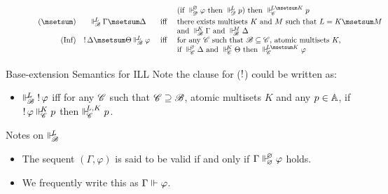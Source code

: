 \documentclass{beamer}
\begin{document}
\begin{frame}
\begin{minipage}{0.47\textwidth}
\begin{figure}[t]
\[\begin{array}{r@{\qquad}l@{\quad}c@{\quad}l}
					& & & (\text{if } \suppM{\baseD}{\emptymultiset}\varphi \text{ then } \suppM{\baseD}{L}p) \text{ then } \suppM{\baseC}{L\msetsum K}p  \\[1mm]
					(\msetsum) & \suppM{\baseB}{L}\Gamma\msetsum\Delta & \text{iff} & \text{there exists multisets } K \text{ and } M \text{ such that } L=K\msetsum M \\ 
					& & &\text{and } \suppM{\baseB}{K}\Gamma \text{ and } \suppM{\baseB}{M}\Delta \\
					\mbox{(Inf)} & \hspace{-1em} \bang\Delta\msetsum\Theta \suppM{\baseB}{L} \varphi & \text{ iff } & \text{for any } \baseC \text{ such that } \baseB \baseLeq \baseC \text{, atomic multisets } K, \\
					& & & \text{if }   \suppM{\baseC}{\emptymultiset} \Delta \text{ and } \suppM{\baseC}{K} \Theta \text{ then } \suppM{\baseC}{L\msetsum K} \varphi \\[1mm]
				\end{array}
			\]
		\end{figure}
	\end{minipage}
\end{frame}
\begin{frame}{Base-extension Semantics for ILL}
	Note the clause for ($\mathop{!}$) could be written as:
	\begin{itemize}
		\item $\Vdash_{ \!\!\mathscr{B} }^{ \!\!L } \mathop{!} \varphi$ iff for any $\mathscr{C}$ such that $\mathscr{C} \supseteq \mathscr{B}$, atomic multisets $K$ and any ${p} \in \mathbb{A}$, if $\mathop{!}\varphi\Vdash_{ \!\!\mathscr{C} }^{ \!\!K }{p}$ then $\Vdash_{ \!\!\mathscr{C} }^{ \!\!L,K }{p}$.
	\end{itemize}
\end{frame}
\begin{frame}{Notes on $\Vdash_{ \!\!\mathscr{B} }^{ \!\!{L} }$}
	\begin{itemize}
	\item The sequent $(\Gamma,\varphi)$ is said to be valid if and only if $\Gamma\Vdash_{ \!\!\varnothing }^{ \!\!\varnothing }\varphi$ holds.
	\vspace{5pt}
	\pause
	\item We frequently write this as $\Gamma \Vdash_{ \!\! }^{ \!\! }\varphi$.
	\end{itemize}
\end{frame}
\end{document}
